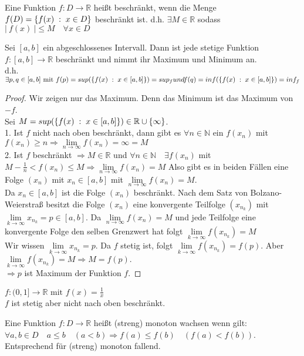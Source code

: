 \documentclass[a4paper,titlepage,oneside]{article}
\def\N{\ensuremath{\mathbb{N}} }
\def\R{\ensuremath{\mathbb{R}} }
\def\sp{\hspace{0,1cm}}
\renewcommand{\liminf}[2][n]{\ensuremath{\lim\limits_{#1 \rightarrow \infty}{#2}}}
\newcommand{\abs}[1]{\ensuremath{\left|\:#1\:\right|}}
\newcommand{\menge}[2]{\ensuremath{\left\{#1\sp : \sp #2\right\}}}
\theoremstyle{thmstyle}
\begin{document}
\begin{defi}
Eine Funktion $f: D \to \R$ heißt beschränkt, wenn die Menge $f(D) = \menge{f(x)}{x \in D}$ beschränkt ist.
d.h. $\exists M \in \R$ sodass $\abs{f(x)} \le M \quad \forall x\in D$
\end{defi}

\begin{satz}
Sei $[a,b]$ ein abgeschlossenes Intervall. Dann ist jede stetige Funktion $f: [a,b] \to \R$ beschränkt und nimmt ihr Maximum und Minimum an.\\
d.h. $\exists p,q \in [a,b] \text{ mit } f(p) = sup(\menge{f(x)}{x\in[a,b]}) = sup_f und f(q) = inf(\menge{f(x)}{x\in[a,b]}) = inf_f$
\begin{proof}
Wir zeigen nur das Maximum. Denn das Minimum ist das Maximum von $-f$. \\
Sei $M = sup(\menge{f(x)}{x\in[a,b]}) \in \R \cup \{\infty\}$.\\
1. Ist $f$ nicht nach oben beschränkt, dann gibt es $\forall n \in \N$ ein $f(x_n)$ mit $f(x_n) \ge n \Rightarrow \liminf{f(x_n)} = \infty = M$\\
2. Ist $f$ beschränkt $\Rightarrow M \in \R$ und $\forall n \in \N \quad \exists f(x_n)$ mit $ M-\frac{1}{n} < f(x_n) \le M \Rightarrow \liminf{f(x_n)} = M$
Also gibt es in beiden Fällen eine Folge $(x_n)$ mit $x_n \in [a,b]$ mit $\liminf{f(x_n)} = M$.\\
Da $x_n \in [a,b]$ ist die Folge $(x_n)$ beschränkt. Nach dem Satz von Bolzano-Weierstraß besitzt die Folge $(x_n)$ eine konvergente Teilfolge $(x_{n_k})$ mit $\liminf[k]{x_{n_k}} = p \in [a,b]$.
Da $\liminf{f(x_n)} = M$ und jede Teilfolge eine konvergente Folge den selben Grenzwert hat folgt $\liminf[k]{f(x_{n_k})} = M$\\
Wir wissen $\liminf[k]{x_{n_k}} = p$. Da $f$ stetig ist, folgt $\liminf[k]{f(x_{n_k})} = f(p)$. Aber $\liminf[k]{f(x_{n_k})} = M \Rightarrow M = f(p).$\\
$\Rightarrow p$ ist Maximum der Funktion $f$.
\end{proof}
\end{satz}

\begin{bem}
$f:(0,1] \to \R \text{ mit } f(x) = \frac{1}{x}$ \\ %
$f$ ist stetig aber nicht nach oben beschränkt.
\end{bem}

\begin{defi}
Eine Funktion $f: D \to \R$ heißt (streng) monoton wachsen wenn gilt: $\forall a,b \in D \quad a \le b \quad (a < b) \Rightarrow f(a) \le f(b) \quad (f(a) < f(b))$. Entsprechend für (streng) monoton fallend.
\end{defi}
\end{document}
